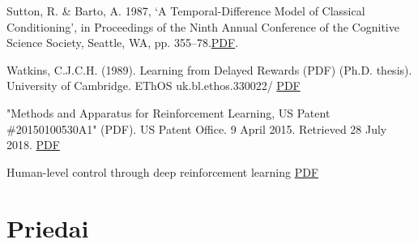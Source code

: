 \documentclass[a4paper, 12pt]{article}
\begin{document}
\newpage
{}


\begin{thebibliography}{99}

Sutton, R. \& Barto, A. 1987, ‘A Temporal-Difference Model of Classical Conditioning’, in Proceedings of the Ninth Annual Conference of the Cognitive Science Society, Seattle, WA, pp. 355–78.\href{http://incompleteideas.net/papers/sutton-barto-TD-87.pdf}{PDF}.

Watkins, C.J.C.H. (1989). Learning from Delayed Rewards (PDF) (Ph.D. thesis). University of Cambridge. EThOS uk.bl.ethos.330022/ \href{https://www.cs.rhul.ac.uk/~chrisw/new_thesis.pdf}{PDF}

 "Methods and Apparatus for Reinforcement Learning, US Patent \#20150100530A1" (PDF). US Patent Office. 9 April 2015. Retrieved 28 July 2018. \href{https://patentimages.storage.googleapis.com/71/91/4a/c5cf4ffa56f705/US20150100530A1.pdf}{PDF}

Human-level control through deep reinforcement learning \href{https://storage.googleapis.com/deepmind-media/dqn/DQNNaturePaper.pdf}{PDF}


\end{thebibliography}
%
%
\newpage
\appendix
\section{Priedai}
\end{document}
